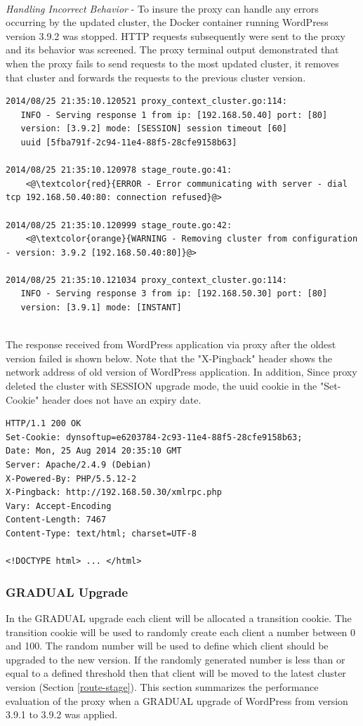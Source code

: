 \documentclass[a4paper,11pt,twoside]{report}
\begin{document}
\noindent\\
\textit{Handling Incorrect Behavior} - To insure the proxy can handle any errors occurring by the updated cluster, the Docker container running WordPress version 3.9.2 was stopped. HTTP requests subsequently were sent to the proxy and its behavior was screened. The proxy terminal output demonstrated that when the proxy fails to send requests to the most updated cluster, it removes that cluster and forwards the requests to the previous cluster version.  \smallskip

\begin{lstlisting}[language=terminal]
2014/08/25 21:35:10.120521 proxy_context_cluster.go:114:     
   INFO - Serving response 1 from ip: [192.168.50.40] port: [80] 
   version: [3.9.2] mode: [SESSION] session timeout [60] 
   uuid [5fba791f-2c94-11e4-88f5-28cfe9158b63]

2014/08/25 21:35:10.120978 stage_route.go:41:    
    <@\textcolor{red}{ERROR - Error communicating with server - dial tcp 192.168.50.40:80: connection refused}@>
   
2014/08/25 21:35:10.120999 stage_route.go:42:  
    <@\textcolor{orange}{WARNING - Removing cluster from configuration - version: 3.9.2 [192.168.50.40:80]}@>

2014/08/25 21:35:10.121034 proxy_context_cluster.go:114:     
   INFO - Serving response 3 from ip: [192.168.50.30] port: [80] 
   version: [3.9.1] mode: [INSTANT]
\end{lstlisting}
 
\noindent\\
The response received from WordPress application via proxy after the oldest version failed is shown below. Note that the "X-Pingback" header shows the network address of old version of WordPress application. In addition, Since proxy deleted the cluster with SESSION upgrade mode, the uuid cookie in the "Set-Cookie" header does not have an expiry date.\smallskip 

\begin{lstlisting}[language=terminal]
HTTP/1.1 200 OK
Set-Cookie: dynsoftup=e6203784-2c93-11e4-88f5-28cfe9158b63;
Date: Mon, 25 Aug 2014 20:35:10 GMT
Server: Apache/2.4.9 (Debian)
X-Powered-By: PHP/5.5.12-2
X-Pingback: http://192.168.50.30/xmlrpc.php
Vary: Accept-Encoding
Content-Length: 7467
Content-Type: text/html; charset=UTF-8

<!DOCTYPE html> ... </html>
\end{lstlisting}

\subsubsection*{GRADUAL Upgrade}
In the GRADUAL upgrade each client will be allocated a transition cookie. The transition cookie will be used to randomly create each client a number between 0 and 100. The random number will be used to define which client should be upgraded to the new version. If the randomly generated number is less than or equal to a defined threshold then that client will be moved to the latest cluster version (Section \ref{route-stage}). This section summarizes the performance evaluation of the proxy when a GRADUAL upgrade of WordPress from version 3.9.1 to 3.9.2 was applied. \medskip
\end{document}
